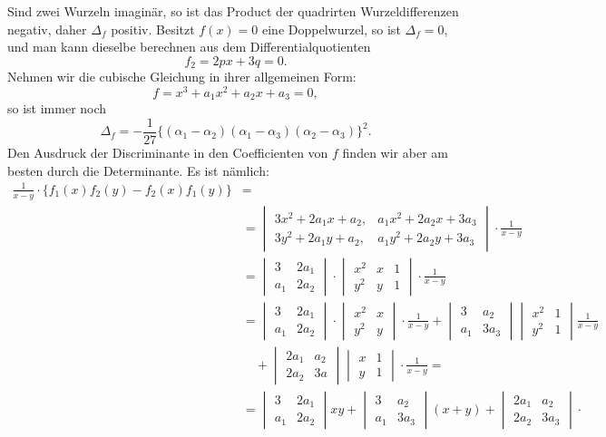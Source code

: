 Sind zwei Wurzeln imaginär, so ist das Product der quadrirten Wurzeldifferenzen negativ, daher $\Delta_f$ positiv. Besitzt $f(x)=0$ eine Doppelwurzel, so ist $\Delta_f=0$, und man kann dieselbe berechnen aus dem Differentialquotienten
\[
f_2 = 2px+3q=0.
\]
Nehmen wir die cubische Gleichung in ihrer allgemeinen Form:
\[
f = x^3+a_1x^2+a_2x+a_3=0,
\]
so ist immer noch
\[
\Delta_f = -\frac{1}{27}\{(\alpha_1-\alpha_2)(\alpha_1-\alpha_3)(\alpha_2-\alpha_3)\}^2.
\]
Den Ausdruck der Discriminante in den Coefficienten von $f$ finden wir aber am besten durch die  Determinante. Es ist nämlich:
\[
\begin{aligned}
\frac{1}{x-y}\cdot\{f_1(x)f_2(y)-f_2(x)f_1(y)\} &=\\
&= \begin{vmatrix} 3x^2+2a_1x+a_2, & a_1x^2+2a_2x+3a_3 \\ 3y^2+2a_1y+a_2, & a_1y^2+2a_2y+3a_3 \end{vmatrix}\cdot\frac{1}{x-y}\\
&= \begin{vmatrix} 3 & 2a_1 \\ a_1 & 2a_2 \end{vmatrix}\cdot\begin{vmatrix} x^2 & x & 1 \\ y^2 & y & 1 \end{vmatrix}\cdot\frac{1}{x-y}\\
&= \begin{vmatrix} 3 & 2a_1 \\ a_1 & 2a_2 \end{vmatrix}\cdot\begin{vmatrix} x^2 & x \\ y^2 & y \end{vmatrix}\cdot\frac{1}{x-y} + \begin{vmatrix} 3 & a_2 \\ a_1 & 3a_3 \end{vmatrix}\begin{vmatrix} x^2 & 1 \\ y^2 & 1 \end{vmatrix}\frac{1}{x-y}\\
&\quad + \begin{vmatrix} 2a_1 & a_2 \\ 2a_2 & 3a \end{vmatrix}\begin{vmatrix} x & 1 \\ y & 1 \end{vmatrix}\cdot\frac{1}{x-y} = %
\\
&= \begin{vmatrix} 3 & 2a_1 \\ a_1 & 2a_2 \end{vmatrix} xy + \begin{vmatrix} 3 & a_2 \\ a_1 & 3a_3 \end{vmatrix}(x+y) + \begin{vmatrix} 2a_1 & a_2 \\ 2a_2 & 3a_3 \end{vmatrix}\cdot
\end{aligned}
\]


